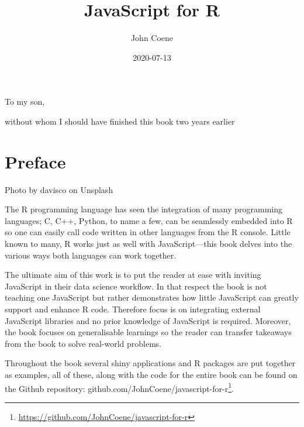 \documentclass[
]{krantz}
\title{JavaScript for R}
\author{John Coene}
\date{2020-07-13}
\renewcommand{\href}[2]{#2\footnote{\url{#1}}}
\begin{document}
\maketitle


\thispagestyle{empty}

\begin{center}
To my son,

without whom I should have finished this book two years earlier
\end{center}

\setlength{\abovedisplayskip}{-5pt}
\setlength{\abovedisplayshortskip}{-5pt}

{
\hypersetup{linkcolor=}
\setcounter{tocdepth}{2}
\tableofcontents
}
\listoftables
\listoffigures
\hypertarget{preface}{%
\chapter*{Preface}\label{preface}}


{Photo by davisco on Unsplash}

The R programming language has seen the integration of many programming languages; C, C++, Python, to name a few, can be seamlessly embedded into R so one can easily call code written in other languages from the R console. Little known to many, R works just as well with JavaScript---this book delves into the various ways both languages can work together.

The ultimate aim of this work is to put the reader at ease with inviting JavaScript in their data science workflow. In that respect the book is not teaching one JavaScript but rather demonstrates how little JavaScript can greatly support and enhance R code. Therefore focus is on integrating external JavaScript libraries and no prior knowledge of JavaScript is required. Moreover, the book focuses on generalisable learnings so the reader can transfer takeaways from the book to solve real-world problems.

Throughout the book several shiny applications and R packages are put together as examples, all of these, along with the code for the entire book can be found on the Github repository: \href{https://github.com/JohnCoene/javascript-for-r}{github.com/JohnCoene/javascript-for-r}.
\end{document}
